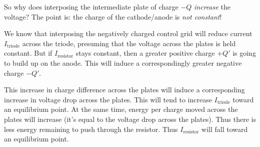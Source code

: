 \documentclass[11pt, oneside]{amsart}
\begin{document}
So why does interposing the intermediate plate of charge $-Q$
\emph{increase} the voltage? The point is: the charge of the
cathode/anode is \emph{not constant}!

We know that interposing the negatively charged control grid will reduce
current $I_\text{triode}$ across the triode, presuming that the voltage
across the plates is held constant. But if $I_\text{resistor}$ stays
constant, then a greater positive charge $+Q'$ is going to build up on
the anode. This will induce a correspondingly greater negative charge
$-Q'$.

This increase in charge difference across the plates will induce a
corresponding increase in voltage drop across the plates. This will tend
to increase $I_\text{triode}$ toward an equilibrium point. At the same
time, energy per charge moved across the plates will increase (it's
equal to the voltage drop across the plates). Thus there is less energy
remaining to push through the resistor. Thus $I_\text{resistor}$ will
fall toward an equilibrium point.
\end{document}
